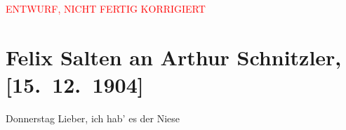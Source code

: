 
\begin{center}
            \textcolor{red}{ENTWURF, NICHT FERTIG KORRIGIERT}
                      \end{center}
            
         
         \renewcommand{\erwaehntePersonen}{Personen: Hansi Niese, Anna Katharina Rehmann, Ottilie Salten, Alfred von Schik-Markenau, Leo Stein}
         \renewcommand{\erwaehnteInstitutionen}{Institutionen: Raimund-Theater}
         \renewcommand{\erwaehnteOrte}{Orte: Wien}
         \renewcommand{\erwaehnteWerke}{Werke: Eduard, der Herzensdieb. Posse mit Gesang in fünf Bildern}
               \section[Felix Salten an Arthur Schnitzler, {[}15. 12. 1904{]}]{ Felix Salten an Arthur Schnitzler, {[}15. 12. 1904{]}}\nopagebreak{}\rehead{ }\begin{ledgroupsized}[t]{13cm}\normalsize\beginnumbering \toendnotes[C]{\smallbreak\pagebreak[2]} 
\toendnotes[C]{\smallbreak}\pstart
           \raggedleft{}{\pb}Donnerstag\pend
           \pstart
           Lieber, ich hab’ es der Niese

\end{ledgroupsized}
